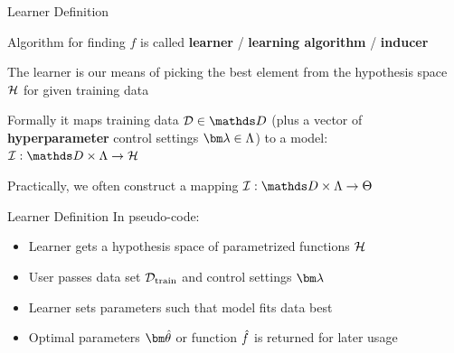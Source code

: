 \documentclass[11pt,compress,t,notes=noshow, xcolor=table]{beamer}
\begin{document}
\begin{framei}{Learner Definition}
\item Algorithm for finding  $f$ is called \textbf{learner} / \textbf{learning algorithm} /  \textbf{inducer}
\item The learner is our means of picking the best element from the hypothesis space $\mathcal{H}$ for given training data
\item Formally it maps training data $\D \in \allDatasets$ (plus a vector of \textbf{hyperparameter} control settings $\lamv \in \Lam$) to a model:
{
\vfill
$\ind: \preimageInducerShort \rightarrow \Hspace$
}
\item Practically, we often construct a mapping 
$\ind: \preimageInducerShort \rightarrow \Theta$
\end{framei}


\begin{framev}{Learner Definition}
In pseudo-code:
\begin{itemize}
\item Learner gets a hypothesis space of parametrized functions $\mathcal{H}$
\item User passes data set $\mathcal{D}_{\text{train}}$ and control settings $\lamv$
\item Learner sets parameters such that model fits data best
\item Optimal parameters $\thetavh$ or function $\hat{f}$ is returned for later usage
\end{itemize}
\end{framev}

\endlecture
\end{document}

